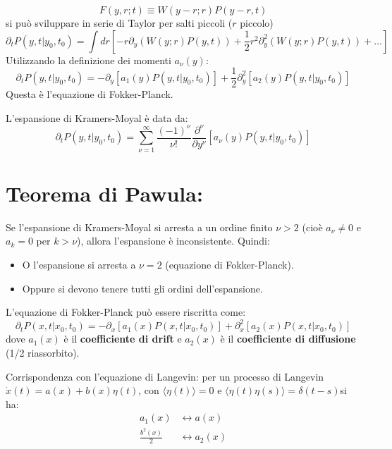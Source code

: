 \begin{equation} F(y,r;t) \equiv W(y-r;r)P(y-r,t) \end{equation}
si può sviluppare in serie di Taylor per salti piccoli ($r$ piccolo)
\begin{equation*}
\partial_t P(y,t|y_0,t_0) = \int dr \left[ -r \partial_y (W(y;r)P(y,t)) + \frac{1}{2}r^2 \partial_y^2 (W(y;r)P(y,t)) + \dots \right]
\end{equation*}
Utilizzando la definizione dei momenti $a_{\nu}(y)$:
\begin{equation}
\partial_t P(y,t|y_0,t_0) = - \partial_y [a_1(y)P(y,t|y_0,t_0)] + \frac{1}{2} \partial_y^2 [a_2(y)P(y,t|y_0,t_0)]
\end{equation}
Questa è l'equazione di Fokker-Planck. 

L'espansione di Kramers-Moyal è data da:
\begin{equation}
\partial_t P(y,t|y_0,t_0) = \sum_{\nu=1}^{\infty} \frac{(-1)^{\nu}}{\nu!} \frac{\partial^{\nu}}{\partial y^{\nu}} [a_{\nu}(y)P(y,t|y_0,t_0)]
\end{equation}


\section{Teorema di Pawula: }
Se l'espansione di Kramers-Moyal si arresta a un ordine finito $\nu > 2$ (cioè $a_{\nu} \neq 0$ e $a_k = 0$ per $k > \nu$), allora l'espansione è inconsistente. Quindi:

\begin{itemize}
    \item O l'espansione si arresta a $\nu=2$ (equazione di Fokker-Planck).
\item Oppure si devono tenere tutti gli ordini dell'espansione.
\end{itemize}

L'equazione di Fokker-Planck può essere riscritta come:
\begin{equation}
\partial_t P(x,t|x_0,t_0) = -\partial_x [a_1(x)P(x,t|x_0,t_0)] + \partial_x^2 [a_2(x)P(x,t|x_0,t_0)]
\end{equation}
dove $a_1(x)$ è il \textbf{coefficiente di drift} e $a_2(x)$ è il \textbf{coefficiente di diffusione} (1/2 riassorbito).

Corrispondenza con l'equazione di Langevin: 
per un processo di Langevin $\dot{x}(t) = a(x) + b(x)\eta(t)$, con $\langle \eta(t) \rangle = 0$ e $\langle \eta(t)\eta(s) \rangle = \delta(t-s)$si ha:
\begin{align*}
a_1(x) & \leftrightarrow a(x) \\
\frac{b^2(x)}{2} & \leftrightarrow a_2(x)
\end{align*}


